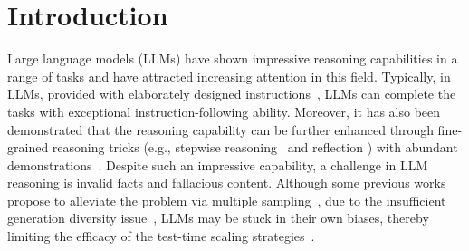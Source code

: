 \documentclass{article} %
\theoremstyle{plain}
\begin{document}
\section{Introduction}
\label{section:introduction}
Large language models (LLMs) have shown impressive reasoning capabilities in a range of tasks and have attracted increasing attention in this field. Typically, in LLMs, provided with elaborately designed instructions~\citep{ouyang2022training}, LLMs can complete the tasks with exceptional instruction-following ability. Moreover, it has also been demonstrated that the reasoning capability can be further enhanced through fine-grained reasoning tricks (e.g., stepwise reasoning~\citep{cot, kojima2022large, zhou2023leasttomost} and reflection \citep{madaan2023selfrefine}) with abundant demonstrations~\citep{icl}. Despite such an impressive capability, a challenge in LLM reasoning is invalid facts and fallacious content. Although some previous works propose to alleviate the problem via multiple sampling~\citep{cot_sc, taubenfeld2025confidence}, due to the insufficient generation diversity issue~\citep{si2025can, hayati2023far}, LLMs may be stuck in their own biases, thereby limiting the efficacy of the test-time scaling strategies~\citep{snell2024scaling, brown2024large}. %

\end{document}

